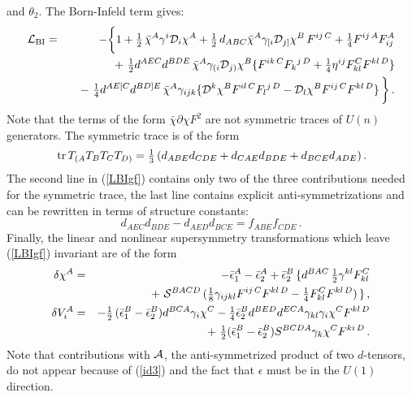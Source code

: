\documentclass[12pt,a4paper]{article}
\def\half{{\textstyle {1 \over 2}}}
\def\quart{{\textstyle {1 \over 4}}}
\def\noverm#1#2{{\textstyle {#1 \over #2}}}
\def\Dpartial{{\cal D}}
\def\tr{\,{\rm tr}\,}
\begin{document}
and $\theta_2$. The Born-Infeld term gives:
\begin{eqnarray}
    {\cal L}_{{\rm BI}} &=& - \bigg\{
    1 + \half\,\bar\chi^A\gamma^i\Dpartial_i\chi^A
       + \half\, {d}_{ABC}  \bar\chi^A
       \gamma_{[i}\Dpartial_{j]}\chi^B\, F^{ij\,C}
       + \noverm{1}{4} F^{ij\,A} F_{ij}^A
\nonumber\\
\label{LBIgf}
     &&\quad
       +\ \noverm{1}{2}
       d^{AEC}d^{BDE}\, \bar\chi^A \gamma_{(i}\Dpartial_{j)}\chi^B
           \{F^{ik\,C}F_{k}{}^{j\,D} + \quart \eta^{ij} F_{kl}^CF^{kl\,D}\}
     \\
     &&\quad    -\ \quart  d^{AE[C}d^{BD]E}\, \bar\chi^A
                      \gamma_{ijk}
      \{\Dpartial^k\chi^B F^{il\,C} F_l{}^{j\,D}
         - \Dpartial_l\chi^B F^{ij\,C}F^{kl\,D}\} \,\bigg\} \,. \nonumber
\end{eqnarray}
Note that the
terms of the form $\bar\chi\partial\chi F^2$ are
not symmetric traces of $U(n)$ generators. The symmetric trace is of the form
\begin{equation}
  \tr T_{(A}T_BT_CT_{D)} =
    \noverm{1}{3}\,( d_{ABE}d_{CDE} + d_{CAE}d_{BDE} + d_{BCE}d_{ADE})\,.
\end{equation}
The second line in (\ref{LBIgf}) contains only two of the three contributions
needed for the symmetric trace, the last line contains explicit
anti-symmetrizations
and can be rewritten in terms of structure constants:
\begin{equation}
\label{id3}
   d_{AEC}d_{BDE}-d_{AED}d_{BCE} = f_{ABE}f_{CDE}\,.
\end{equation}
Finally, the linear and nonlinear supersymmetry transformations which leave
(\ref{LBIgf}) invariant are of the form
\begin{eqnarray}
   \delta\chi^A &=& -\bar\epsilon_1^A - \bar\epsilon_2^A
    + \bar\epsilon_2^B\,
    \{  d^{BAC}\,\half \gamma^{kl} F_{kl}^C
    \nonumber\\
     &&\quad    +\ {\cal S}^{BACD}\,
               ( \noverm{1}{8} \gamma_{ijkl}
          F^{ij\,C} F^{kl\,D} -\quart F_{kl}^C F^{kl\,D})
          \,\}   \,,
   \nonumber\\
   \delta V_i^A &=&  -\half\, (\bar\epsilon_1^B - \bar\epsilon_2^B)
            d^{BCA}\gamma_i\chi^C
         -\quart \bar\epsilon_2^B
         d^{BED}d^{ECA} \gamma_{kl}\gamma_i\chi^C F^{kl\,D}
                 \nonumber\\
      &&\quad +\ \half (\bar\epsilon_1^B-\bar\epsilon^B_2)
            S^{BCDA} \gamma_k \chi^C F^{ki\,D}
        \,.
\end{eqnarray}
Note that contributions with ${\cal A}$, the anti-symmetrized product of two
$d$-tensors, do not appear because of (\ref{id3}) and the fact that $\epsilon$
must be in the $U(1)$ direction.
\end{document}
